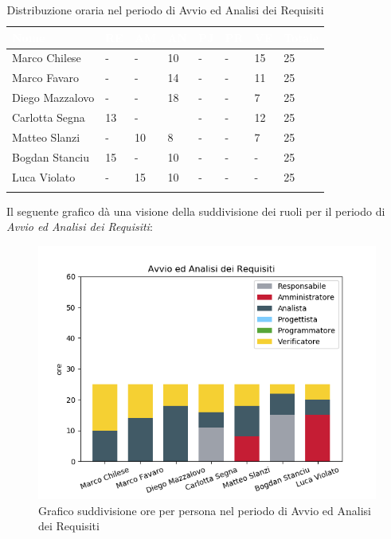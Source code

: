 \begin{longtable}{|C{.30\textwidth}|C{.06\textwidth}|C{.06\textwidth}|C{.06\textwidth} | C{.06\textwidth}| C{.06\textwidth} | C{.06\textwidth} | C{.10\textwidth} |}
\hline
{}	\textbf{\textcolor{white}{Nome}} & \textbf{\textcolor{white}{RE}} & \textbf{\textcolor{white}{AM}} & \textbf{\textcolor{white}{AN}} & \textbf{\textcolor{white}{PJ}} & \textbf{\textcolor{white}{PR}} & \textbf{\textcolor{white}{VE}} & \textbf{\textcolor{white}{Totale}}\\
\hline 
Marco Chilese & - & - & 10 & - & - & 15 & 25 \\
\hline
{}Marco Favaro & - & - & 14 & - & - & 11 & 25 \\
\hline
Diego Mazzalovo & - & - & 18 & - & - & 7 & 25 \\
\hline
{}Carlotta Segna & 13 & - &  & - & - & 12 & 25 \\
\hline
Matteo Slanzi & - & 10 & 8 & - & - & 7 & 25 \\
\hline
{}Bogdan Stanciu & 15 & - & 10 & - & - & - & 25\\
\hline
Luca Violato & - & 15 & 10 & - & - & - & 25 \\
\hline


\caption{Distribuzione oraria nel periodo di Avvio ed Analisi dei Requisiti}
\label{tab:dist oraria aar}
\end{longtable}

Il seguente grafico dà una visione della suddivisione dei ruoli per il periodo di \textit{Avvio ed Analisi dei Requisiti}:

\begin{figure}[H]
	\centering
  		\includegraphics[width=1\linewidth]{./images/fig_aar.png}
  		\caption{Grafico suddivisione ore per persona nel periodo di Avvio ed Analisi dei Requisiti}
  		\label{fig:grafico suddivione ruoli aar}
\end{figure}



